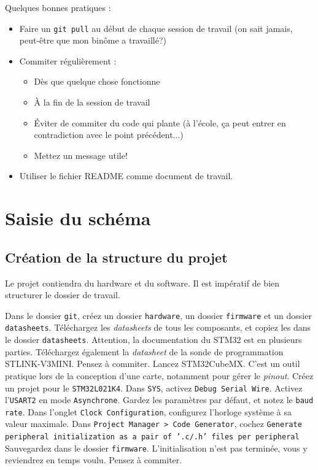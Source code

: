 \documentclass[12pt,%
addpoints,%
]{exam}
\begin{document}
\begin{tcolorbox}
	Quelques bonnes pratiques :
	\begin{itemize}
		\item Faire un \texttt{git pull} au début de chaque session de travail (on sait jamais, peut-être que mon binôme a travaillé?)
		\item Commiter régulièrement :
			\begin{itemize}
				\item Dès que quelque chose fonctionne
				\item À la fin de la session de travail
				\item Éviter de commiter du code qui plante (à l'école, ça peut entrer en contradiction avec le point précédent...)
				\item Mettez un message utile!
			\end{itemize}
		\item Utiliser le fichier README comme document de travail.
	\end{itemize}
\end{tcolorbox}

\section{Saisie du schéma}
\subsection{Création de la structure du projet}
Le projet contiendra du hardware et du software. Il est impératif de bien structurer le dossier de travail.
\begin{questions}
	\question Dans le dossier \texttt{git}, créez un dossier \texttt{hardware}, un dossier \texttt{firmware} et un dossier \texttt{datasheets}.
	\question Téléchargez les \emph{datasheets} de tous les composants, et copiez les dans le dossier \texttt{datasheets}. 
		Attention, la documentation du STM32 est en plusieurs parties.
		Téléchargez également la \emph{datasheet} de la sonde de programmation STLINK-V3MINI. Pensez à commiter.
	\question Lancez STM32CubeMX. C'est un outil pratique lors de la conception d'une carte, notamment pour gérer le \emph{pinout}.
	\question Créez un projet pour le \texttt{STM32L021K4}. 
	\question Dans \texttt{SYS}, activez \texttt{Debug Serial Wire}.
	\question Activez l'\texttt{USART2} en mode \texttt{Asynchrone}. Gardez les paramètres par défaut, et notez le \texttt{baud rate}.
	\question Dans l'onglet \texttt{Clock Configuration}, configurez l'horloge système à sa valeur maximale.
	\question Dans \texttt{Project Manager > Code Generator}, cochez \texttt{Generate peripheral initialization as a pair of '.c/.h' files per peripheral}
	\question Sauvegardez dans le dossier \texttt{firmware}. L'initialisation n'est pas terminée, vous y reviendrez en temps voulu.
	\question Pensez à commiter.
\end{questions}
\end{document}
